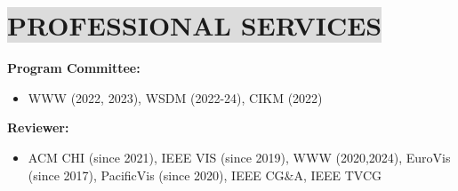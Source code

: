 \section*{
    \colorbox{gainsboro}{PROFESSIONAL SERVICES}
}
\textbf{Program Committee:}
\vspace{-3mm}
\begin{itemize}[leftmargin=5mm,noitemsep,itemsep=0pt]
    \item WWW (2022, 2023), WSDM (2022-24), CIKM (2022)
\end{itemize}

\textbf{Reviewer:}
\vspace{-3mm}
\begin{itemize}[leftmargin=5mm,noitemsep,itemsep=0pt]
    \item ACM CHI (since 2021), IEEE VIS (since 2019), WWW (2020,2024), EuroVis (since 2017), PacificVis (since 2020), IEEE CG\&A, IEEE TVCG
\end{itemize}

